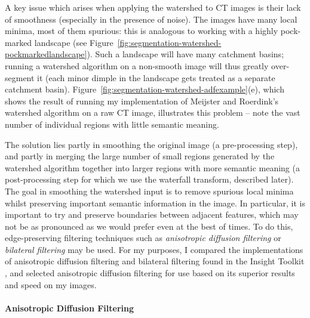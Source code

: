 A key issue which arises when applying the watershed to CT images is their lack of smoothness (especially in the presence of noise). The images have many local minima, most of them spurious: this is analogous to working with a highly pock-marked landscape (see Figure~\ref{fig:segmentation-watershed-pockmarkedlandscape}). Such a landscape will have many catchment basins; running a watershed algorithm on a non-smooth image will thus greatly over-segment it (each minor dimple in the landscape gets treated as a separate catchment basin). Figure~\ref{fig:segmentation-watershed-adfexample}(e), which shows the result of running my implementation of Meijster and Roerdink's watershed algorithm on a raw CT image, illustrates this problem -- note the vast number of individual regions with little semantic meaning.


The solution lies partly in smoothing the original image (a pre-processing step), and partly in merging the large number of small regions generated by the watershed algorithm together into larger regions with more semantic meaning (a post-processing step for which we use the waterfall transform, described later). The goal in smoothing the watershed input is to remove spurious local minima whilst preserving important semantic information in the image. In particular, it is important to try and preserve boundaries between adjacent features, which may not be as pronounced as we would prefer even at the best of times. To do this, edge-preserving filtering techniques such as \emph{anisotropic diffusion filtering} \cite{perona90} or \emph{bilateral filtering} \cite{tomasi98} may be used. For my purposes, I compared the implementations of anisotropic diffusion filtering and bilateral filtering found in the Insight Toolkit \cite{itk}, and selected anisotropic diffusion filtering for use based on its superior results and speed on my images.

\paragraph{Anisotropic Diffusion Filtering}

